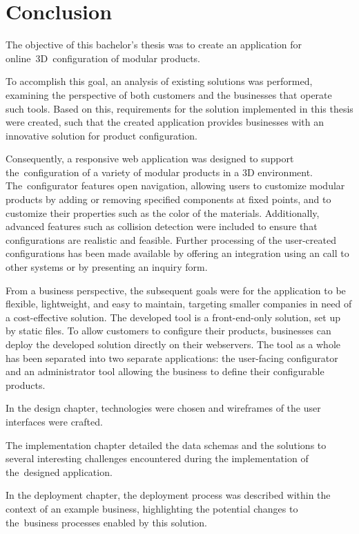 \chapter{Conclusion}

The objective of this bachelor's thesis was to create an application for online~3D~configuration of modular products.

To accomplish this goal, an analysis of existing solutions was performed, examining the perspective of both customers and the businesses that operate such tools. Based on this, requirements for the solution implemented in this thesis were created, such that the created application provides businesses with an innovative solution for product configuration.

Consequently, a responsive web application was designed to support the~configuration of a variety of modular products in a 3D environment. The~configurator features open navigation, allowing users to customize modular products by adding or removing specified components at fixed points, and to customize their properties such as the color of the materials. Additionally, advanced features such as collision detection were included to ensure that configurations are realistic and feasible. Further processing of the user-created configurations has been made available by offering an integration using an  call to other systems or by presenting an inquiry form.

From a business perspective, the subsequent goals were for the application to be flexible, lightweight, and easy to maintain, targeting smaller companies in need of a cost-effective solution. The developed tool is a front-end-only solution, set up by static files. To allow customers to configure their products, businesses can deploy the developed solution directly on their webservers. The tool as a whole has been separated into two separate applications: the user-facing configurator and an administrator tool allowing the business to define their configurable products.

In the design chapter, technologies were chosen and wireframes of the user interfaces were crafted.

The implementation chapter detailed the data schemas and the solutions to several interesting challenges encountered during the implementation of the~designed application.

In the deployment chapter, the deployment process was described within the context of an example business, highlighting the potential changes to the~business processes enabled by this solution.

